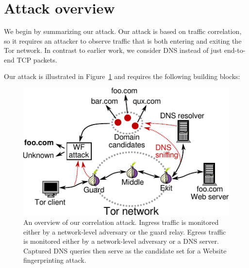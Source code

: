 \section{Attack overview}
\label{sec:attack}
We begin by summarizing our attack.  Our attack is based on traffic correlation,
so it requires an attacker to observe traffic that is both entering and exiting
the Tor network.  In contrast to earlier work, we consider DNS instead of just
end-to-end TCP packets.

Our attack is illustrated in Figure~\ref{fig:attack-scenario} and requires the
following building blocks:

\begin{figure}[t]
	\centering
	\includegraphics[width=\linewidth]{figures/attack-scenario.pdf}
	\caption{An overview of our correlation attack.  Ingress traffic is
	monitored either by a network-level adversary or the guard relay.  Egress
	traffic is monitored either by a network-level adversary or a DNS server.
	Captured DNS queries then serve as the candidate set for a Website
	fingerprinting attack.}
	\label{fig:attack-scenario}
\end{figure}

